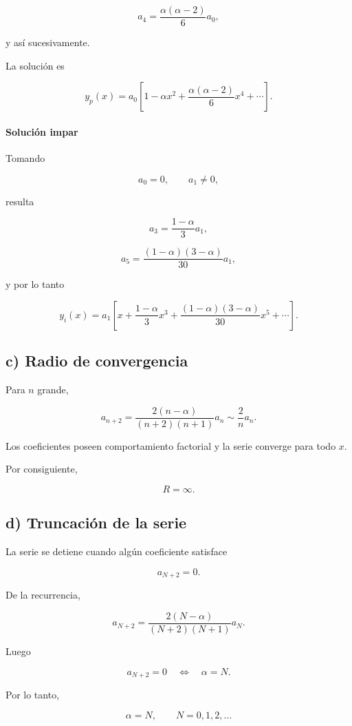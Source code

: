 \documentclass[11pt,spanish]{article}
\begin{document}
\[
a_4=
\frac{\alpha(\alpha-2)}{6}a_0,
\]

y así sucesivamente.

La solución es

\[
y_p(x)
=
a_0
\left[
1
-\alpha x^2
+
\frac{\alpha(\alpha-2)}{6}x^4
+\cdots
\right].
\]

\paragraph{Solución impar}

Tomando

\[
a_0=0,
\qquad
a_1\neq 0,
\]

resulta

\[
a_3
=
\frac{1-\alpha}{3}a_1,
\]

\[
a_5
=
\frac{(1-\alpha)(3-\alpha)}{30}a_1,
\]

y por lo tanto

\[
y_i(x)
=
a_1
\left[
x
+
\frac{1-\alpha}{3}x^3
+
\frac{(1-\alpha)(3-\alpha)}{30}x^5
+\cdots
\right].
\]

\subsection*{c) Radio de convergencia}

Para \(n\) grande,

\[
a_{n+2}
=
\frac{2(n-\alpha)}
     {(n+2)(n+1)}
a_n
\sim
\frac{2}{n}a_n.
\]

Los coeficientes poseen comportamiento factorial y la serie converge para todo \(x\).

Por consiguiente,

\[
\boxed{
R=\infty.
}
\]

\subsection*{d) Truncación de la serie}

La serie se detiene cuando algún coeficiente satisface

\[
a_{N+2}=0.
\]

De la recurrencia,

\[
a_{N+2}
=
\frac{2(N-\alpha)}
     {(N+2)(N+1)}
a_N.
\]

Luego

\[
a_{N+2}=0
\quad\Longleftrightarrow\quad
\alpha=N.
\]

Por lo tanto,

\[
\boxed{
\alpha=N,
\qquad
N=0,1,2,\ldots
}
\]
\end{document}
